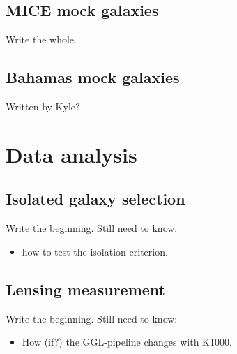 \documentclass[fleqn,usenatbib]{mnras}
\begin{document}
\subsection{MICE mock galaxies}
\label{sec:mice_mocks}
Write the whole.

\subsection{Bahamas mock galaxies}
\label{sec:bahamas_mocks}
Written by Kyle?

\section{Data analysis}
\label{sec:analysis}

\subsection{Isolated galaxy selection}
\label{sec:isolation}
Write the beginning.
Still need to know:
\begin{itemize}
	\item how to test the isolation criterion.
\end{itemize}

\subsection{Lensing measurement}
\label{sec:lensing}
Write the beginning.
Still need to know:
\begin{itemize}
	\item How (if?) the GGL-pipeline changes with K1000.
\end{itemize}
\end{document}

